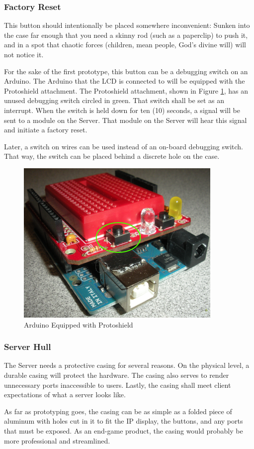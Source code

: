 \subsubsection{Factory Reset}
This button should intentionally be placed somewhere inconvenient: 
Sunken into the case far enough that you need a skinny rod (such as a paperclip) to push it, and in a spot
that chaotic forces (children, mean people, God's divine will) will not notice it. 

For the sake of the first prototype, this button can be a debugging switch on an Arduino. 
The Arduino that the \ac{LCD} is connected to will be equipped with the Protoshield attachment. 
The Protoshield attachment, shown in Figure \ref{Protoshield}, has an unused debugging switch circled in green. 
That switch shall be set as an interrupt. 
When the switch is held down for ten (10) seconds, a signal will be sent to a module on the Server. 
That module on the Server will hear this signal and initiate a factory reset. 

Later, a switch on wires can be used instead of an on-board debugging switch. 
That way, the switch can be placed behind a discrete hole on the case.


\begin{figure}
\centering
\includegraphics[scale=0.6]{Hardware/images/ProtoShield.png}
\caption{Arduino Equipped with Protoshield}
\label{Protoshield}
\end{figure}
	
\subsubsection{Server Hull}
The Server needs a protective casing for several reasons. 
On the physical level, a durable casing will protect the hardware. 
The casing also serves to render unnecessary ports inaccessible to users. 
Lastly, the casing shall meet client expectations of what a server looks like.

As far as prototyping goes, the casing can be as simple as a folded piece of aluminum
with holes cut in it to fit the \ac{IP} display, the buttons, and any ports that must be
exposed. As an end-game product, the casing would probably be more professional and streamlined.
